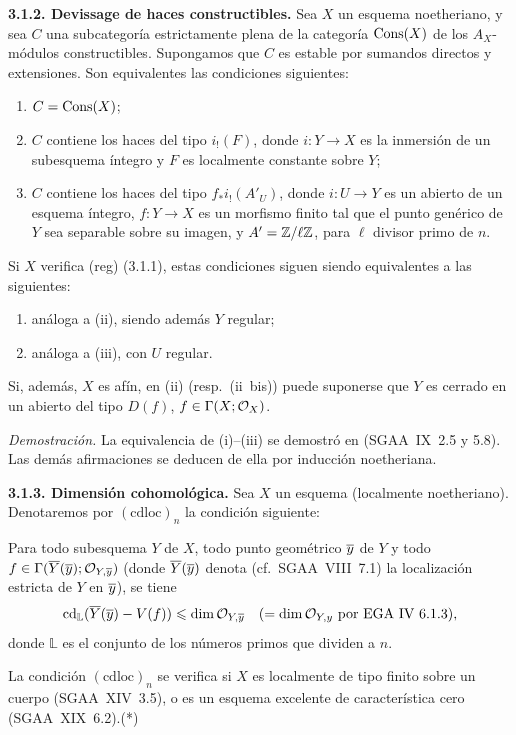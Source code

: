 \textbf{3.1.2. Devissage de haces constructibles.} Sea $X$ un esquema noetheriano, y sea $C$ una subcategoría estrictamente plena de la categoría $\operatorname{Cons}(X)$ de los $A_X$-módulos constructibles. Supongamos que $C$ es estable por sumandos directos y extensiones. Son equivalentes las condiciones siguientes:
\begin{enumerate}
\item[(i)] $C = \operatorname{Cons}(X)$;
\item[(ii)] $C$ contiene los haces del tipo $i_{!}(F)$, donde $i : Y \to X$ es la inmersión de un subesquema íntegro y $F$ es localmente constante sobre $Y$;
\item[(iii)] $C$ contiene los haces del tipo $f_{*}i_{!}(A'_U)$, donde $i : U \to Y$ es un abierto de un esquema íntegro, $f : Y \to X$ es un morfismo finito tal que el punto genérico de $Y$ sea separable sobre su imagen, y $A' = \mathbb{Z}/\ell\mathbb{Z}$, para $\ell$ divisor primo de $n$.
\end{enumerate}
Si $X$ verifica (reg) (3.1.1), estas condiciones siguen siendo equivalentes a las siguientes:
\begin{enumerate}
\item[(ii~bis)] análoga a (ii), siendo además $Y$ regular;
\item[(iii~bis)] análoga a (iii), con $U$ regular.
\end{enumerate}
Si, además, $X$ es afín, en (ii) (resp.~(ii~bis)) puede suponerse que $Y$ es cerrado en un abierto del tipo $D(f)$, $f \in \Gamma(X; \mathcal{O}_X)$.

\emph{Demostración.} La equivalencia de (i)--(iii) se demostró en (SGAA~IX~2.5 y 5.8). Las demás afirmaciones se deducen de ella por inducción noetheriana.

\textbf{3.1.3. Dimensión cohomológica.} Sea $X$ un esquema (localmente noetheriano). Denotaremos por $(\mathrm{cdloc})_n$ la condición siguiente:

Para todo subesquema $Y$ de $X$, todo punto geométrico $\overline{y}$ de $Y$ y todo $f \in \Gamma(\overline{Y}(\overline{y}); \mathcal{O}_{Y,\overline{y}})$ (donde $\overline{Y}(\overline{y})$ denota (cf.~SGAA~VIII~7.1) la localización estricta de $Y$ en $\overline{y}$), se tiene
\[
\operatorname{cd}_{\mathbb{L}}(\overline{Y}(\overline{y}) - V(f)) \leqslant \dim \mathcal{O}_{Y,\overline{y}} \quad (= \dim \mathcal{O}_{Y,y} \text{ por EGA~IV~6.1.3}),
\]
donde $\mathbb{L}$ es el conjunto de los números primos que dividen a $n$.

La condición $(\mathrm{cdloc})_n$ se verifica si $X$ es localmente de tipo finito sobre un cuerpo (SGAA~XIV~3.5), o es un esquema excelente de característica cero (SGAA~XIX~6.2).(*)

